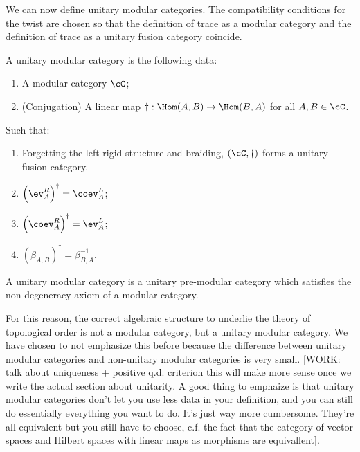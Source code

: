 We can now define unitary modular categories. The compatibility conditions for the twist are chosen so that the definition of trace as a modular category and the definition of trace as a unitary fusion category coincide.

\begin{defn} A unitary modular category is the following data:

\begin{enumerate}
\item A modular category $\cC$;
\item (Conjugation) A linear map $\dagger: \Hom(A,B)\to \Hom(B,A)$ for all $A,B\in \cC$.
\end{enumerate}

Such that:

\begin{enumerate}
\item Forgetting the left-rigid structure and braiding, $\left(\cC,\dagger\right)$ forms a unitary fusion category.
\item $\left(\ev_{A}^R\right)^{\dagger}=\coev_{A}^L$;
\item $\left(\coev_{A}^R\right)^{\dagger}=\ev_{A}^L$;
\item $\left(\beta_{A,B}\right)^{\dagger}=\beta_{B,A}^{-1}$.
\end{enumerate}

\raggedleft\qedsymbol{}
\end{defn}

\begin{defn} A unitary modular category is a unitary pre-modular category which satisfies the non-degeneracy axiom of a modular category.
\end{defn}

For this reason, the correct algebraic structure to underlie the theory of topological order is not a modular category, but a unitary modular category. We have chosen to not emphasize this before because the difference between unitary modular categories and non-unitary modular categories is very small. [WORK: talk about uniqueness + positive q.d. criterion this will make more sense once we write the actual section about unitarity. A good thing to emphaize is that unitary modular categories don't let you use less data in your definition, and you can still do essentially everything you want to do. It's just way more cumbersome. They're all equivalent but you still have to choose, c.f. the fact that the category of vector spaces and Hilbert spaces with linear maps as morphisms are equivallent].

